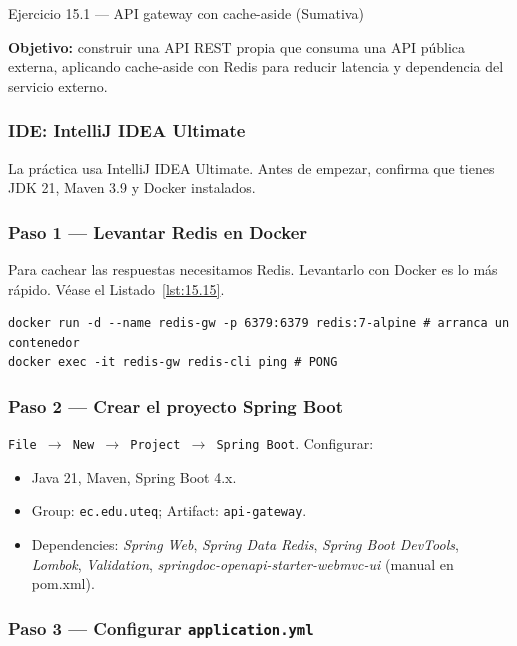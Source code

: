 \begin{cajaejercicio}{Ejercicio 15.1 --- API gateway con cache-aside (Sumativa)}

\textbf{Objetivo:} construir una API REST propia que consuma una API
pública externa, aplicando cache-aside con Redis para reducir
latencia y dependencia del servicio externo.

\subsubsection*{IDE: IntelliJ IDEA Ultimate}

La práctica usa IntelliJ IDEA Ultimate. Antes de empezar,
confirma que tienes JDK 21, Maven 3.9 y Docker instalados.


\subsubsection*{Paso 1 --- Levantar Redis en Docker}

Para cachear las respuestas necesitamos Redis. Levantarlo
con Docker es lo más rápido. V\'ease el Listado~\ref{lst:15.15}.


\begin{lstlisting}[style=shell,numbers=none,caption={Ejemplo de Shell},label=lst:15.15]
docker run -d --name redis-gw -p 6379:6379 redis:7-alpine # arranca un contenedor
docker exec -it redis-gw redis-cli ping # PONG
\end{lstlisting}

\subsubsection*{Paso 2 --- Crear el proyecto Spring Boot}

\texttt{File $\rightarrow$ New $\rightarrow$ Project $\rightarrow$
Spring Boot}. Configurar:
\begin{itemize}
\item Java 21, Maven, Spring Boot 4.x.
\item Group: \texttt{ec.edu.uteq}; Artifact: \texttt{api-gateway}.
\item Dependencies: \emph{Spring Web}, \emph{Spring Data Redis},
\emph{Spring Boot DevTools}, \emph{Lombok}, \emph{Validation},
\emph{springdoc-openapi-starter-webmvc-ui} (manual en pom.xml).
\end{itemize}

\subsubsection*{Paso 3 --- Configurar \texttt{application.yml}}


\end{cajaejercicio}
